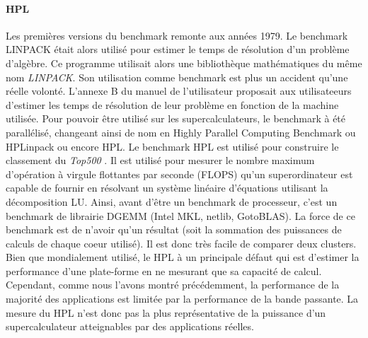 \paragraph{HPL} Les premières versions du benchmark remonte aux années 1979. Le benchmark LINPACK était alors utilisé pour estimer le temps de résolution d'un problème d'algèbre. Ce programme utilisait alors une bibliothèque mathématiques du même nom \textit{LINPACK}. Son utilisation comme benchmark est plus un accident qu'une réelle volonté. L'annexe B du manuel de l'utilisateur proposait aux utilisateeurs d'estimer les temps de résolution de leur problème en fonction de la machine utilisée. Pour pouvoir être utilisé sur les supercalculateurs, le benchmark à été parallélisé, changeant ainsi de nom en Highly Parallel Computing Benchmark ou HPLinpack ou encore HPL.  Le benchmark HPL est utilisé pour construire le  classement du \textit{Top500} \cite{HPC:top500}. Il est utilisé pour mesurer le nombre maximum d'opération à virgule flottantes par seconde (FLOPS) qu'un superordinateur est capable de fournir en résolvant un système linéaire d'équations utilisant la décomposition LU. Ainsi, avant d'être un benchmark de processeur, c'est un benchmark de librairie DGEMM (Intel MKL, netlib, GotoBLAS). La force de ce benchmark est de n'avoir qu'un résultat (soit la sommation des puissances de calculs de chaque coeur utilisé). Il est donc très facile de comparer deux clusters. Bien que mondialement utilisé, le HPL à un principale défaut qui est d'estimer la performance d'une plate-forme en ne mesurant que sa capacité de calcul. Cependant, comme nous l'avons montré précédemment, la performance de la majorité des applications est limitée par la performance de la bande passante. La mesure du HPL n'est donc pas la plus représentative de la puissance d'un supercalculateur atteignables par des applications réelles. 




